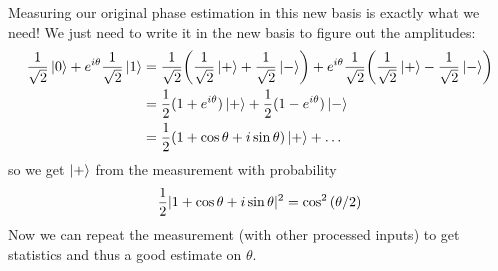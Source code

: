 Measuring our original phase estimation in this new basis is exactly what we need! We just need to write it in the new
basis to figure out the amplitudes:
\begin{align}
    \frac{1}{\sqrt{2}} \ket{0} + e^{i \theta} \frac{1}{\sqrt{2}} \ket{1} &= \frac{1}{\sqrt{2}} \qty(\frac{1}{\sqrt{2}} \ket{+} + \frac{1}{\sqrt{2}} \ket{-}) + e^{i\theta} \frac{1}{\sqrt{2}} \qty(\frac{1}{\sqrt{2}} \ket{+} - \frac{1}{\sqrt{2}} \ket{-}) \\
    &= \frac{1}{2} (1 + e^{i \theta}) \ket{+} + \frac{1}{2} (1 - e^{i \theta}) \ket{-} \\
    &= \frac{1}{2} \qty(1 + \cos \theta + i \sin \theta) \ket{+} + \dots \\
\end{align}
so we get $\ket{+}$ from the measurement with probability
\[ \frac{1}{2} |1 + \cos \theta + i \sin \theta|^2 = \cos^2 \qty(\theta/2) \]
Now we can repeat the measurement (with other processed inputs) to get statistics and thus a good estimate on $\theta$.